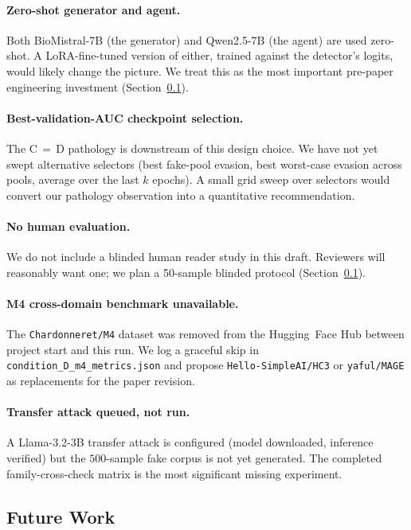 \documentclass[conference]{IEEEtran}
\begin{document}
\paragraph{Zero-shot generator and agent.}
Both BioMistral-7B (the generator) and Qwen2.5-7B (the agent) are used
zero-shot. A LoRA-fine-tuned version of either, trained against the
detector's logits, would likely change the picture. We treat this as
the most important pre-paper engineering investment
(Section~\ref{ssec:future}).

\paragraph{Best-validation-AUC checkpoint selection.}
The C\,$=$\,D pathology is downstream of this design choice. We have not
yet swept alternative selectors (best fake-pool evasion, best worst-case
evasion across pools, average over the last $k$ epochs). A small grid
sweep over selectors would convert our pathology observation into a
quantitative recommendation.

\paragraph{No human evaluation.}
We do not include a blinded human reader study in this draft. Reviewers
will reasonably want one; we plan a 50-sample blinded protocol
(Section~\ref{ssec:future}).

\paragraph{M4 cross-domain benchmark unavailable.}
The \texttt{Chardonneret/M4} dataset \cite{wang2024m4} was removed from
the Hugging~Face Hub between project start and this run. We log a
graceful skip in \texttt{condition\_D\_m4\_metrics.json} and propose
\texttt{Hello-SimpleAI/HC3} \cite{guo2023hc3} or
\texttt{yaful/MAGE} \cite{li2024mage} as replacements for the paper
revision.

\paragraph{Transfer attack queued, not run.}
A Llama-3.2-3B transfer attack is configured (model downloaded,
inference verified) but the \(500\)-sample fake corpus is not yet
generated. The completed family-cross-check matrix is the most
significant missing experiment.

\subsection{Future Work}
\label{ssec:future}
\end{document}
